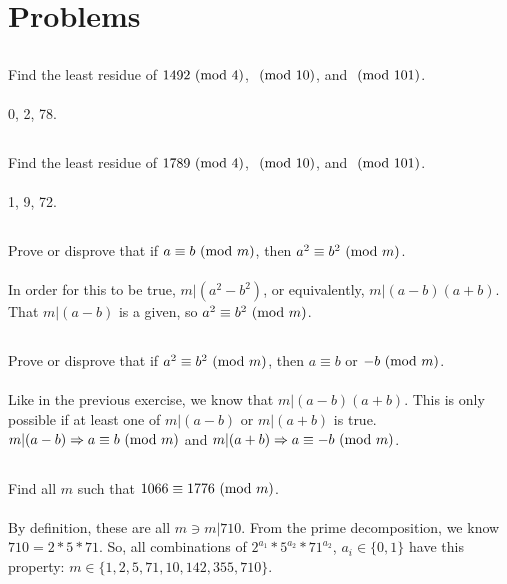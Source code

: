 \documentclass{article}
\begin{document}
\section{Problems}

\subsection{}
Find the least residue of $1492 \ (\mathrm{mod}\ 4)$, $\ (\mathrm{mod}\ 10)$, and $\ (\mathrm{mod}\ 101)$.\\~\\
0, 2, 78.

\subsection{}
Find the least residue of $1789 \ (\mathrm{mod}\ 4)$, $\ (\mathrm{mod}\ 10)$, and $\ (\mathrm{mod}\ 101)$.\\~\\
1, 9, 72.

\subsection{}
Prove or disprove that if $a \equiv b \ (\mathrm{mod}\ m)$, then $a^2 \equiv b^2 \ (\mathrm{mod}\ m)$.\\~\\
In order for this to be true, $m|(a^2 - b^2)$, or equivalently, $m|(a - b)(a + b)$.
That $m|(a - b)$ is a given, so $a^2 \equiv b^2 \ (\mathrm{mod}\ m)$.

\subsection{}
Prove or disprove that if $a^2 \equiv b^2 \ (\mathrm{mod}\ m)$, then $a \equiv b$ or $-b \ (\mathrm{mod}\ m)$.\\~\\
Like in the previous exercise, we know that $m|(a - b)(a + b)$.
This is only possible if at least one of $m|(a - b)$ or $m|(a + b)$ is true.
$m|(a - b) \Rightarrow a \equiv b \ (\mathrm{mod}\ m)$ and
$m|(a + b) \Rightarrow a \equiv -b \ (\mathrm{mod}\ m)$.

\subsection{}
Find all $m$ such that $1066 \equiv 1776 \ (\mathrm{mod}\ m)$.\\~\\
By definition, these are all $m \ni m|710$.
From the prime decomposition, we know $710 = 2 * 5 * 71$.
So, all combinations of $2^{a_1} * 5^{a_2} * 71^{a_2}$, $a_i \in \{0, 1\}$
have this property: $m \in \{1, 2, 5, 71, 10, 142, 355, 710\}$.
\end{document}
